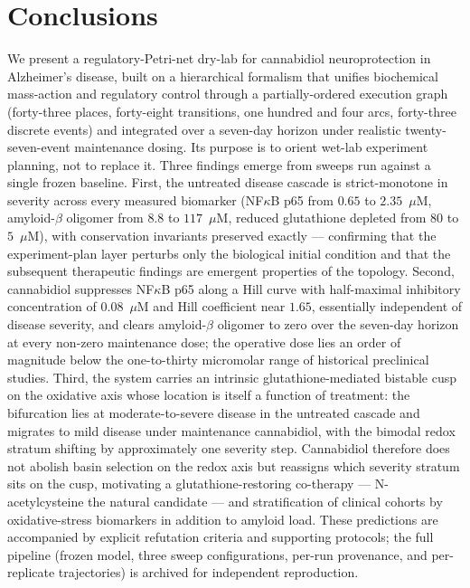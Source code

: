 \documentclass[10pt,letterpaper]{article}
\begin{document}
\section{Conclusions}

We present a regulatory-Petri-net dry-lab for cannabidiol neuroprotection in Alzheimer's disease, built on a hierarchical formalism that unifies biochemical mass-action and regulatory control through a partially-ordered execution graph (forty-three places, forty-eight transitions, one hundred and four arcs, forty-three discrete events) and integrated over a seven-day horizon under realistic twenty-seven-event maintenance dosing. Its purpose is to orient wet-lab experiment planning, not to replace it. Three findings emerge from sweeps run against a single frozen baseline. First, the untreated disease cascade is strict-monotone in severity across every measured biomarker (NF$\kappa$B p65 from $0.65$ to $2.35$~$\mu$M, amyloid-$\beta$ oligomer from $8.8$ to $117$~$\mu$M, reduced glutathione depleted from $80$ to $5$~$\mu$M), with conservation invariants preserved exactly --- confirming that the experiment-plan layer perturbs only the biological initial condition and that the subsequent therapeutic findings are emergent properties of the topology. Second, cannabidiol suppresses NF$\kappa$B p65 along a Hill curve with half-maximal inhibitory concentration of $0.08$~$\mu$M and Hill coefficient near $1.65$, essentially independent of disease severity, and clears amyloid-$\beta$ oligomer to zero over the seven-day horizon at every non-zero maintenance dose; the operative dose lies an order of magnitude below the one-to-thirty micromolar range of historical preclinical studies. Third, the system carries an intrinsic glutathione-mediated bistable cusp on the oxidative axis whose location is itself a function of treatment: the bifurcation lies at moderate-to-severe disease in the untreated cascade and migrates to mild disease under maintenance cannabidiol, with the bimodal redox stratum shifting by approximately one severity step. Cannabidiol therefore does not abolish basin selection on the redox axis but reassigns which severity stratum sits on the cusp, motivating a glutathione-restoring co-therapy --- N-acetylcysteine the natural candidate --- and stratification of clinical cohorts by oxidative-stress biomarkers in addition to amyloid load. These predictions are accompanied by explicit refutation criteria and supporting protocols; the full pipeline (frozen model, three sweep configurations, per-run provenance, and per-replicate trajectories) is archived for independent reproduction.
\end{document}
